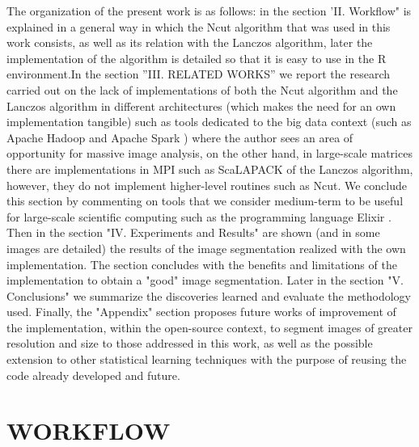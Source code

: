 \documentclass[conference]{IEEEtran}
\begin{document}
The organization of the present work is as follows: in the section 'II. Workflow" is explained in a general way in which the Ncut algorithm that was used in this work consists, as well as its relation with the Lanczos algorithm, later the implementation of the algorithm is detailed so that it is easy to use in the R environment.In the section ''III. RELATED WORKS'' we report the research carried out on the lack of implementations of both the Ncut algorithm and the Lanczos algorithm in different architectures (which makes the need for an own implementation tangible) such as tools dedicated to the big data context (such as Apache Hadoop \cite{Hadoop} and Apache Spark \cite{Spark}) where the author sees an area of opportunity for massive image analysis, on the other hand, in large-scale matrices there are implementations in MPI such as ScaLAPACK \cite{ScaLAPACK} of the Lanczos algorithm, however, they do not implement higher-level routines such as Ncut. We conclude this section by commenting on tools that we consider medium-term to be useful for large-scale scientific computing such as the programming language Elixir \cite{Elixir}. \\
Then in the section "IV. Experiments and Results" are shown (and in some images are detailed) the results of the image segmentation realized with the own implementation. The section concludes with the benefits and limitations of the implementation to obtain a "good" image segmentation. Later in the section "V. Conclusions" we summarize the discoveries learned and evaluate the methodology used. Finally, the "Appendix" section proposes future works of improvement of the implementation, within the open-source context, to segment images of greater resolution and size to those addressed in this work, as well as the possible extension to other statistical learning techniques with the purpose of reusing the code already developed and future. \\
\section{WORKFLOW}
\end{document}
